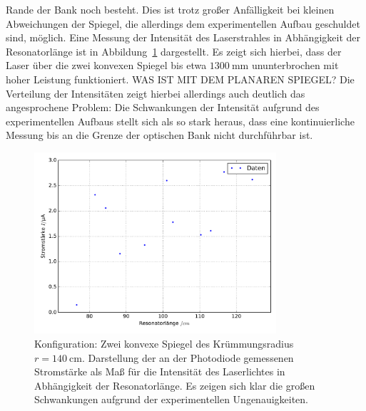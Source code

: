 Rande der Bank noch besteht. Dies ist trotz großer Anfälligkeit bei kleinen Abweichungen der Spiegel, die allerdings dem experimentellen Aufbau
geschuldet sind, möglich. Eine Messung der Intensität des Laserstrahles in Abhängigkeit der Resonatorlänge ist in Abbildung~\ref{fig:kk}
dargestellt. Es zeigt sich hierbei, dass der Laser über die zwei konvexen Spiegel bis etwa $\SI{1300}{\milli\meter}$ ununterbrochen mit hoher Leistung funktioniert.
WAS IST MIT DEM PLANAREN SPIEGEL?
Die Verteilung der Intensitäten zeigt hierbei allerdings auch deutlich das angesprochene Problem: Die Schwankungen der Intensität aufgrund
des experimentellen Aufbaus stellt sich als so stark heraus, dass eine kontinuierliche Messung bis an die Grenze der optischen Bank nicht
durchführbar ist.
%
\begin{figure}[htb]
  \centering
  \includegraphics[width=0.8\textwidth]{auswertung/plot_kk.pdf}
  \caption{Konfiguration: Zwei konvexe Spiegel des Krümmungsradius $r=\SI{140}{\centi\meter}$. Darstellung der an der Photodiode gemessenen Stromstärke als Maß für die Intensität des Laserlichtes in Abhängigkeit der Resonatorlänge. Es zeigen sich klar die großen Schwankungen aufgrund der experimentellen Ungenauigkeiten.}
  \label{fig:kk}
\end{figure}
%
